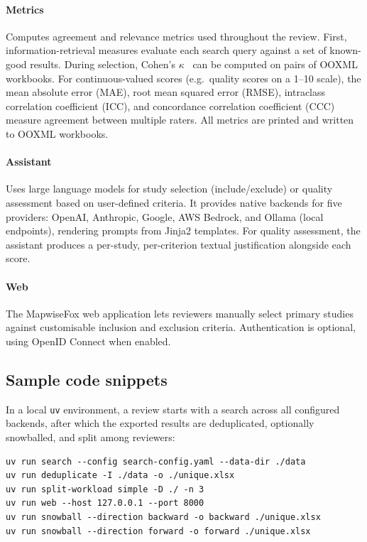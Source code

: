 \documentclass[preprint,12pt, a4paper]{elsarticle}
\begin{document}
\paragraph{Metrics} Computes agreement and relevance metrics used
throughout the review. First, information-retrieval measures evaluate each
search query against a set of known-good results. During selection,
Cohen's $\kappa$~\cite{cohen1960} can be computed on pairs of OOXML workbooks.
For continuous-valued scores (e.g.\ quality scores on a 1--10 scale), the
mean absolute error (MAE), root mean squared error (RMSE), intraclass
correlation coefficient (ICC), and concordance correlation coefficient
(CCC) measure agreement between multiple raters. All metrics are printed
and written to OOXML workbooks.

\paragraph{Assistant} Uses large language models for study selection
(include/exclude) or quality assessment based on user-defined criteria.
It provides native backends for five providers: OpenAI, Anthropic, Google,
AWS Bedrock, and Ollama (local endpoints), rendering prompts from Jinja2
templates. For quality assessment, the assistant produces a per-study,
per-criterion textual justification alongside each score.

\paragraph{Web} The MapwiseFox web application lets reviewers
manually select primary studies against customisable inclusion and
exclusion criteria. Authentication is optional, using OpenID Connect
when enabled.

\subsection{Sample code snippets}

In a local \texttt{uv} environment, a review starts with a search across
all configured backends, after which the exported results are deduplicated,
optionally snowballed, and split among reviewers:

\begin{verbatim}
uv run search --config search-config.yaml --data-dir ./data
uv run deduplicate -I ./data -o ./unique.xlsx
uv run split-workload simple -D ./ -n 3
uv run web --host 127.0.0.1 --port 8000
uv run snowball --direction backward -o backward ./unique.xlsx
uv run snowball --direction forward -o forward ./unique.xlsx

\end{verbatim}
\end{document}

